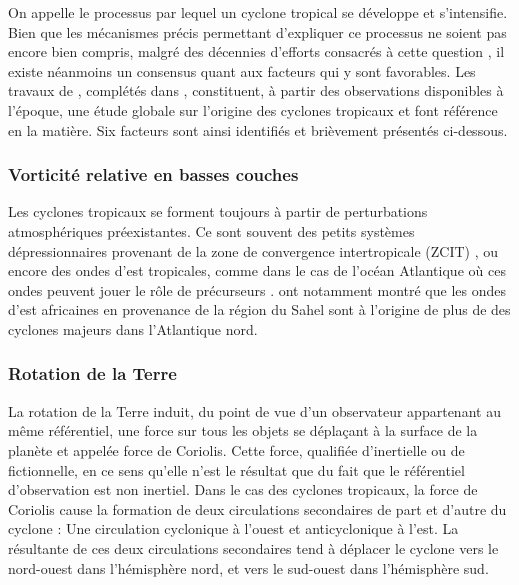 \documentclass[../main.tex]{subfiles}
\begin{document}
On appelle  le processus par lequel un cyclone tropical se développe et s'intensifie. Bien que les mécanismes précis permettant
d'expliquer ce processus ne soient pas encore bien compris, malgré des décennies d'efforts consacrés à cette question \parencite{yanai_formation_1964, gray_global_1968, 
montgomery_tropical_1993, gray_formation_1998, tory_tropical_2010}, il existe néanmoins un consensus quant aux facteurs qui y sont favorables. Les travaux de
\textcite{gray_global_1968}, complétés dans \textcite{gray_tropical_1975}, constituent, à partir des observations disponibles à l'époque, une étude globale sur
l'origine des cyclones tropicaux et font référence en la matière. Six facteurs sont ainsi identifiés et brièvement présentés ci-dessous.

\subsubsection*{Vorticité relative en basses couches}

Les cyclones tropicaux se forment toujours à partir de perturbations atmosphériques préexistantes. Ce sont souvent des petits systèmes dépressionnaires
provenant de la zone de convergence intertropicale (ZCIT) \parencite{gray_global_1968}, ou encore des ondes d'est tropicales, comme dans le cas de l'océan
Atlantique où ces ondes peuvent jouer le rôle de précurseurs \parencite{thorncroft_african_2001,patricola_response_2018}. \textcite{landsea_strong_1992} ont
notamment montré que les ondes d'est africaines en provenance de la région du Sahel sont à l'origine de plus de  des cyclones majeurs dans l'Atlantique
nord.


\subsubsection*{Rotation de la Terre}

La rotation de la Terre induit, du point de vue d'un observateur appartenant au même référentiel, une force sur tous les objets se déplaçant à la surface de la
planète et appelée force de Coriolis. Cette force, qualifiée d'inertielle ou de fictionnelle, en ce sens qu'elle n'est le résultat que du fait que le
référentiel d'observation est non inertiel. Dans le cas des cyclones tropicaux, la force de Coriolis cause la formation de deux circulations secondaires de part
et d'autre du cyclone : Une circulation cyclonique à l'ouest et anticyclonique à l'est. La résultante de ces deux circulations secondaires tend à déplacer le
cyclone vers le nord-ouest dans l'hémisphère nord, et vers le sud-ouest dans l'hémisphère sud.
\end{document}
